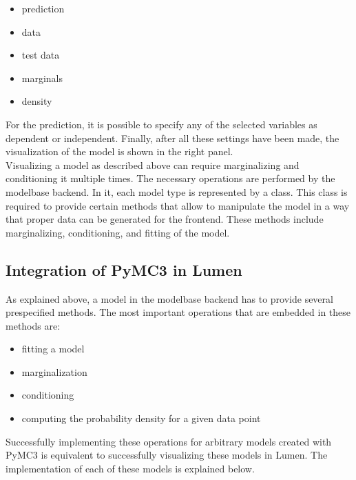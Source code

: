 \documentclass{article}
\begin{document}
\begin{itemize}
	\item prediction
	\item data
	\item test data
	\item marginals
	\item density
\end{itemize}
For the prediction, it is possible to specify any of the selected variables as dependent or independent. Finally, after all these settings have been made, the visualization of the model is shown in the right panel.
\\
Visualizing a model as described above can require marginalizing and conditioning it multiple times. The necessary operations are performed by the modelbase backend.
In it, each model type is represented by a class. This class is required to provide certain methods that allow to manipulate the model in a way that proper data can be generated for the frontend. These methods include marginalizing, conditioning, and fitting of the model.


\subsection{Integration of PyMC3 in Lumen}
As explained above, a model in the modelbase backend has to provide several prespecified methods. The most important operations that are embedded in these methods are:
\begin{itemize}
	\item fitting a model
	\item marginalization
	\item conditioning
	\item computing the probability density for a given data point
\end{itemize}
Successfully implementing these operations for arbitrary models created with PyMC3 is equivalent to successfully visualizing these models in Lumen. The implementation of each of these models is explained below.
\end{document}
